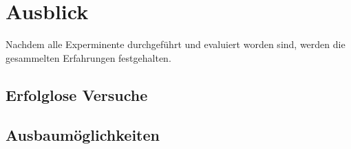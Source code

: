 \section{Ausblick}
Nachdem alle Experminente durchgeführt und evaluiert worden sind, werden die gesammelten Erfahrungen festgehalten.

\subsection{Erfolglose Versuche}

\subsection{Ausbaumöglichkeiten}

